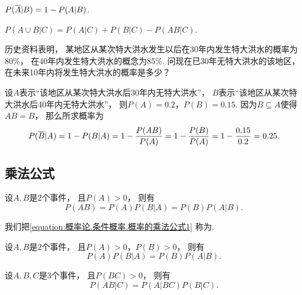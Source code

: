 \begin{property}
\(P(\SetComplementaryL{A} \vert B)
= 1 - P(A \vert B)\).
\end{property}

\begin{property}
\(P(A \cup B \vert C)
= P(A \vert C) + P(B \vert C) - P(AB \vert C)\).
\end{property}

\begin{example}
历史资料表明，
某地区从某次特大洪水发生以后在30年内发生特大洪水的概率为80\%，
在40年内发生特大洪水的概念为85\%.
问现在已30年无特大洪水的该地区，
在未来10年内将发生特大洪水的概率是多少？
\begin{solution}
设\(A\)表示“该地区从某次特大洪水后30年内无特大洪水”，
\(B\)表示“该地区从某次特大洪水后40年内无特大洪水”，
则\(P(A) = 0.2\)，\(P(B) = 0.15\).
因为\(B \subseteq A\)使得\(AB = B\)，
那么所求概率为\begin{equation*}
	P(\SetComplementaryL{B} \vert A)
	= 1 - P(B \vert A)
	= 1 - \frac{P(AB)}{P(A)}
	= 1 - \frac{P(B)}{P(A)}
	= 1 - \frac{0.15}{0.2}
	= 0.25.
\end{equation*}
\end{solution}
\end{example}

\subsection{乘法公式}
\begin{theorem}
设\(A,B\)是\(2\)个事件，
且\(P(A) > 0\)，
则有\begin{equation}\label{equation:概率论.条件概率.概率的乘法公式1}
	P(AB)
	= P(A) P(B \vert A)
	= P(B) P(A \vert B).
\end{equation}
\end{theorem}
我们把\cref{equation:概率论.条件概率.概率的乘法公式1}
称为.

\begin{corollary}
设\(A,B\)是\(2\)个事件，
且\(P(A) > 0\)，\(P(B) > 0\)，
则有\begin{equation}
	P(A) P(B \vert A)
	= P(B) P(A \vert B).
\end{equation}
\end{corollary}

\begin{corollary}
设\(A,B,C\)是\(3\)个事件，
且\(P(B C) > 0\)，
则有\begin{equation}%
	P(A B \vert C)
	= P(A \vert B C) P(B \vert C).
\end{equation}
\end{corollary}

